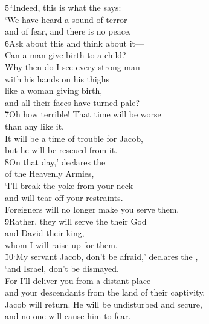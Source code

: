 \begin{poetry}
\poeml \v{5}``Indeed, this is what the  says: \\
\poeml `We have heard a sound of terror \\
\poemll    and of fear, and there is no peace. \\
\poeml \v{6}Ask about this and think about it--- \\
\poemll    Can a man give birth to a child? \\
\poeml Why then do I see every strong man \\
\poemll    with his hands on his thighs \\
\poeml like a woman giving birth, \\
\poemll    and all their faces have turned pale? \\
\poeml \v{7}Oh how terrible! That time will be worse \\
\poemll    than any like it. \\
\poeml It will be a time of trouble for Jacob, \\
\poemll    but he will be rescued from it. \\
\poeml \v{8}On that day,' declares the  \\
\poemll    of the Heavenly Armies, \\
\poeml `I'll break the yoke from your neck \\
\poemll    and will tear off your restraints. \\
\poemlll       Foreigners will no longer make you serve them. \\
\poeml \v{9}Rather, they will serve the  their God \\
\poemll    and David their king, \\
\poemlll       whom I will raise up for them. \\
\poeml \v{10}`My servant Jacob, don't be afraid,' declares the , \\
\poemll    `and Israel, don't be dismayed. \\
\poeml For I'll deliver you from a distant place \\
\poemll    and your descendants from the land of their captivity. \\
\poeml Jacob will return. He will be undisturbed and secure, \\
\poemll    and no one will cause him to fear. \\

\end{poetry}

